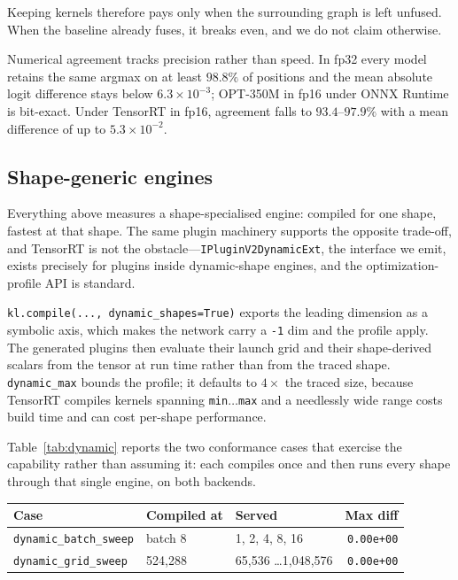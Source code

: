 \documentclass[10pt]{article}
\begin{document}
Keeping kernels therefore pays only when the surrounding graph is left unfused.
When the baseline already fuses, it breaks even, and we do not claim otherwise.

Numerical agreement tracks precision rather than speed. In fp32 every model
retains the same argmax on at least $98.8\%$ of positions and the mean absolute
logit difference stays below $6.3\times10^{-3}$; OPT-350M in fp16 under ONNX
Runtime is bit-exact. Under TensorRT in fp16, agreement falls to
$93.4$--$97.9\%$ with a mean difference of up to $5.3\times10^{-2}$.

\subsection{Shape-generic engines}
\label{sec:dynamic}

Everything above measures a shape-specialised engine: compiled for one shape,
fastest at that shape. The same plugin machinery supports the opposite
trade-off, and TensorRT is not the obstacle---\texttt{IPluginV2DynamicExt}, the
interface we emit, exists precisely for plugins inside dynamic-shape engines, and
the optimization-profile API is standard.

\texttt{kl.compile(..., dynamic\_shapes=True)} exports the leading dimension as a
symbolic axis, which makes the network carry a \texttt{-1} dim and the profile
apply. The generated plugins then evaluate their launch grid and their
shape-derived scalars from the tensor at run time rather than from the traced
shape. \texttt{dynamic\_max} bounds the profile; it defaults to $4\times$ the
traced size, because TensorRT compiles kernels spanning \texttt{min}$\ldots$\texttt{max}
and a needlessly wide range costs build time and can cost per-shape performance.

Table~\ref{tab:dynamic} reports the two conformance cases that exercise the
capability rather than assuming it: each compiles once and then runs every shape
through that single engine, on both backends.

\begin{center}
\small
\begin{tabular}{l l l r}
\toprule
\textbf{Case} & \textbf{Compiled at} & \textbf{Served} & \textbf{Max diff} \\ \midrule
\texttt{dynamic\_batch\_sweep} & batch 8 & 1, 2, 4, 8, 16 & \texttt{0.00e+00} \\
\texttt{dynamic\_grid\_sweep} & 524{,}288 & 65{,}536 \ldots 1{,}048{,}576 & \texttt{0.00e+00} \\
\bottomrule
\end{tabular}
\label{tab:dynamic}
\end{center}
\end{document}
